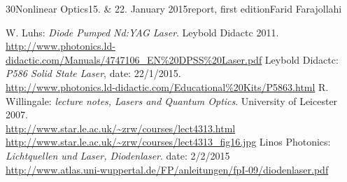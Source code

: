 \documentclass[a4paper, parskip=half, 12pt, bibliography=totocnumbered]{scrartcl}
\begin{document}
{30}{Nonlinear Optics}{15. \& 22. January 2015}{report, first edition}{Farid Farajollahi}{}





\begin{thebibliography}{10}
 W. Luhs: \emph{Diode Pumped Nd:YAG Laser}. Leybold Didactc 2011.\\
\url{http://www.photonics.ld-didactic.com/Manuals/4747106_EN%20DPSS%20Laser.pdf}
 Leybold Didactc: \emph{P586 Solid State Laser}, date: 22/1/2015.\\
\url{http://www.photonics.ld-didactic.com/Educational%20Kits/P5863.html}
 R. Willingale: \emph{lecture notes, Lasers and Quantum Optics}. University of Leicester 2007.\\
\url{http://www.star.le.ac.uk/~zrw/courses/lect4313.html}\\
\url{http://www.star.le.ac.uk/~zrw/courses/lect4313_fig16.jpg}
 Linos Photonics: \emph{Lichtquellen und Laser, Diodenlaser}. date: 2/2/2015\\
\url{http://www.atlas.uni-wuppertal.de/FP/anleitungen/fpI-09/diodenlaser.pdf}
\end{thebibliography}
\end{document}
